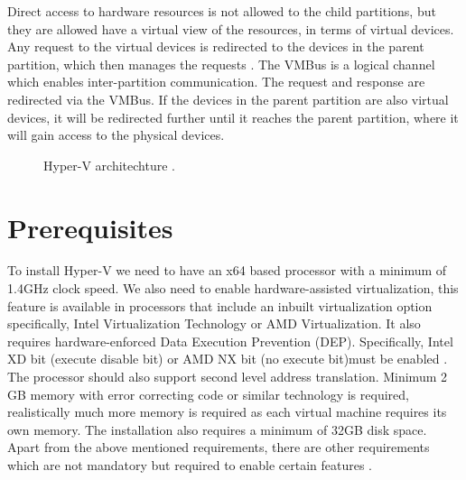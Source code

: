 \documentclass[9pt,twocolumn,twoside]{../../styles/osajnl}
\begin{document}
Direct access to hardware resources is not allowed to the child
partitions, but they are allowed have a virtual view of the resources,
in terms of virtual devices. Any request to the virtual devices is
redirected to the devices in the parent partition, which then manages
the requests \cite{www-hyperv-architecture}. The VMBus is a logical
channel which enables inter-partition communication. The request and
response are redirected via the VMBus. If the devices in the parent
partition are also virtual devices, it will be redirected further
until it reaches the parent partition, where it will gain access to
the physical devices.

\begin{figure}[htbp]
\centering
{}
\caption{Hyper-V architechture \cite{www-hyperv-wikipedia}.}
\label{fig:false-color}
\end{figure}

\section{Prerequisites}

To install Hyper-V we need to have an x64 based processor with a
minimum of 1.4GHz clock speed. We also need to enable
hardware-assisted virtualization, this feature is available in
processors that include an inbuilt virtualization option specifically,
Intel Virtualization Technology or AMD Virtualization. It also
requires hardware-enforced Data Execution Prevention
(DEP). Specifically, Intel XD bit (execute disable bit) or AMD NX bit
(no execute bit)must be enabled \cite{www-hyperv-paper2}. The
processor should also support second level address
translation. Minimum 2 GB memory with error correcting code or similar
technology is required, realistically much more memory is required as
each virtual machine requires its own memory. The installation also
requires a minimum of 32GB disk space. Apart from the above mentioned
requirements, there are other requirements which are not mandatory but
required to enable certain features \cite{www-hyperv-wikipedia}.
\end{document}
